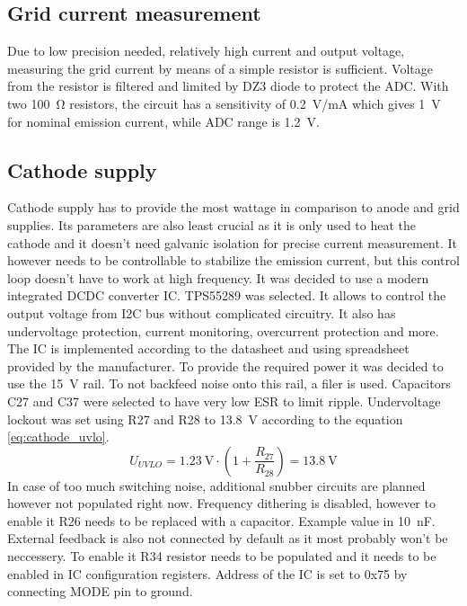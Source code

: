 \documentclass{article}
\begin{document}
\subsection{Grid current measurement}
Due to low precision needed, relatively high current and output voltage, measuring the grid current by means of a simple resistor is sufficient. Voltage from the resistor is filtered and limited by DZ3 diode to protect the ADC.
With two \SI{100}{\ohm} resistors, the circuit has a sensitivity of \SI{0.2}{\volt/\milli\ampere} which gives \SI{1}{\volt} for nominal emission current, while ADC range is \SI{1.2}{\volt}.




\subsection{Cathode supply}
Cathode supply has to provide the most wattage in comparison to anode and grid supplies. Its parameters are also least crucial as it is only used to heat the cathode and it doesn't need galvanic isolation for precise current measurement.
It however needs to be controllable to stabilize the emission current, but this control loop doesn't have to work at high frequency.
It was decided to use a modern integrated DCDC converter IC. TPS55289 was selected. It allows to control the output voltage from I2C bus without complicated circuitry. It also has undervoltage protection, current monitoring, overcurrent protection and more.
The IC is implemented according to the datasheet and using spreadsheet provided by the manufacturer. To provide the required power it was decided to use the \SI{15}{\volt} rail. To not backfeed noise onto this rail, a filer is used. Capacitors C27 and C37 were selected to have very low ESR to limit ripple.
Undervoltage lockout was set using R27 and R28 to \SI{13.8}{\volt} according to the equation \ref{eq:cathode_uvlo}.
\begin{equation}
	U_{UVLO} = \SI{1.23}{\volt}\cdot\left(1+\frac{R_{27}}{R_{28}}\right) = \SI{13.8}{\volt}
	\label{eq:cathode_uvlo}
\end{equation}
In case of too much switching noise, additional snubber circuits are planned however not populated right now. Frequency dithering is disabled, however to enable it R26 needs to be replaced with a capacitor. Example value in \SI{10}{\nano\farad}.
External feedback is also not connected by default as it most probably won't be neccessery. To enable it R34 resistor needs to be populated and it needs to be enabled in IC configuration registers. Address of the IC is set to 0x75 by connecting MODE pin to ground.
\end{document}
